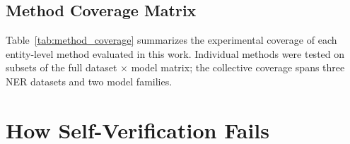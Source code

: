 \subsection{Method Coverage Matrix}\label{app:method_coverage}

Table~\ref{tab:method_coverage} summarizes the experimental coverage of each entity-level method evaluated in this work. Individual methods were tested on subsets of the full dataset $\times$ model matrix; the collective coverage spans three NER datasets and two model families.

\begin{table}[h]
\centering
\small
\caption{Experimental coverage of entity-level methods. \checkmark = tested; --- = not tested. All methods use $N{=}8$, $T{=}1.0$ unless noted. Section references indicate where results appear.}
\label{tab:method_coverage}
\end{table}

\section{How Self-Verification Fails}\label{sec:mechanistic}


